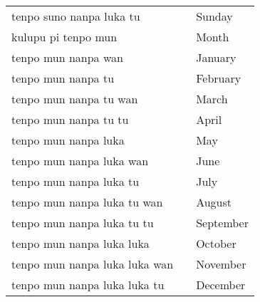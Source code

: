 \begin{supertabular}{p{4,5cm}|ll}
tenpo suno nanpa luka tu && Sunday \\
kulupu pi tenpo mun && Month \\
tenpo mun nanpa wan && January \\
tenpo mun nanpa tu && February \\
tenpo mun nanpa tu wan &&  March \\
tenpo mun nanpa tu tu && April \\
tenpo mun nanpa luka &&  May  \\
tenpo mun nanpa luka wan && June \\ 
tenpo mun nanpa luka tu && July \\
tenpo mun nanpa luka tu wan && August \\
tenpo mun nanpa luka tu tu && September \\
tenpo mun nanpa luka luka && October \\
tenpo mun nanpa luka luka wan && November \\
tenpo mun nanpa luka luka tu && December \\
\end{supertabular} \\
%
%
%
